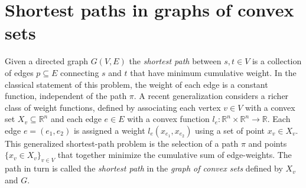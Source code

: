\documentclass[letterpaper, 11pt]{article}
\begin{document}
%


\section{Shortest paths in graphs of convex sets}
Given a directed graph $G(V, E)$ the \emph{shortest path} between $s, t \in V$
is a collection of edges $p \subseteq E$ connecting $s$ and $t$ that have minimum cumulative weight.
In the classical statement of this problem, the weight
of each edge is a constant function, independent of the path $\pi$. 
A recent generalization considers a richer class of weight functions,
defined by associating each vertex $v \in V$ with a convex set $X_v \subseteq \mathbb{R}^n$ 
and each  edge $e \in E$ with a convex function 
$l_e : \mathbb{R}^n \times \mathbb{R}^n \rightarrow \mathbb{R}$.
Each edge $e = (e_1, e_2)$ is assigned a weight $l_e(x_{e_1}, x_{e_2})$ 
using a set of point $x_v \in X_v$.  This generalized shortest-path problem  is the selection of a
path $\pi$ and points $\{x_v \in X_v\}_{v \in V}$ that together minimize the cumulative sum of edge-weights.
The path in turn is called the \emph{shortest path} in the \emph{graph of convex sets} 
defined by $X_v$ and $G$.
\end{document}
